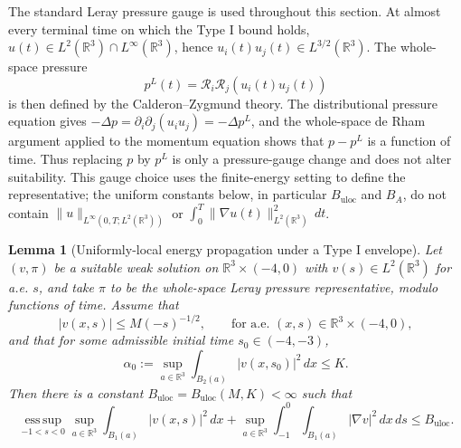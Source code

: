 \documentclass[11pt]{amsart}
\theoremstyle{plain}
\newtheorem{lemma}[lemma]{Lemma}
\theoremstyle{definition}
\theoremstyle{remark}
\numberwithin{equation}{section}
\begin{document}
The standard Leray pressure gauge is used throughout this section.  At almost
every terminal time on which the Type I bound holds,
\(u(t)\in L^2(\mathbb R^3)\cap L^\infty(\mathbb R^3)\), hence
\(u_i(t)u_j(t)\in L^{3/2}(\mathbb R^3)\).  The whole-space pressure
\[
  p^L(t)=\mathcal R_i\mathcal R_j(u_i(t)u_j(t))
\]
is then defined by the Calderon--Zygmund theory.  The distributional pressure
equation gives
\(-\Delta p=\partial_i\partial_j(u_i u_j)=-\Delta p^L\), and the whole-space
de Rham argument applied to the momentum equation shows that \(p-p^L\) is a
function of time.  Thus replacing \(p\) by \(p^L\) is only a pressure-gauge
change and does not alter suitability.  This gauge choice uses the
finite-energy setting to define the representative; the uniform constants
below, in particular \(B_{\mathrm{uloc}}\) and \(B_A\), do not contain
\(\|u\|_{L^\infty(0,T;L^2(\mathbb R^3))}\) or
\(\int_0^T\|\nabla u(t)\|_{L^2(\mathbb R^3)}^2\,dt\).

\begin{lemma}[Uniformly-local energy propagation under a Type I envelope]
\label{p0:lem:uloc-typeI-propagation}
Let \((v,\pi)\) be a suitable weak solution on
\(\mathbb R^3\times(-4,0)\) with \(v(s)\in L^2(\mathbb R^3)\) for a.e.
\(s\), and take \(\pi\) to be the whole-space Leray pressure representative,
modulo functions of time.  Assume that
\begin{equation}\label{p0:eq:unit-typeI-envelope}
  |v(x,s)|\le M(-s)^{-1/2},
  \qquad \text{for a.e. }(x,s)\in\mathbb R^3\times(-4,0),
\end{equation}
and that for some admissible initial time \(s_0\in(-4,-3)\),
\begin{equation}\label{p0:eq:unit-uloc-initial}
  \alpha_0
  :=\sup_{a\in\mathbb R^3}\int_{B_2(a)} |v(x,s_0)|^2\,dx
  \le K .
\end{equation}
Then there is a constant \(B_{\mathrm{uloc}}=B_{\mathrm{uloc}}(M,K)<\infty\)
such that
\begin{equation}\label{p0:eq:unit-uloc-bound}
  \operatorname*{ess\,sup}_{-1<s<0}\sup_{a\in\mathbb R^3}
  \int_{B_1(a)} |v(x,s)|^2\,dx
  +
  \sup_{a\in\mathbb R^3}\int_{-1}^{0}\int_{B_1(a)}
  |\nabla v|^2\,dx\,ds
  \le B_{\mathrm{uloc}} .
\end{equation}
\end{lemma}
\end{document}
